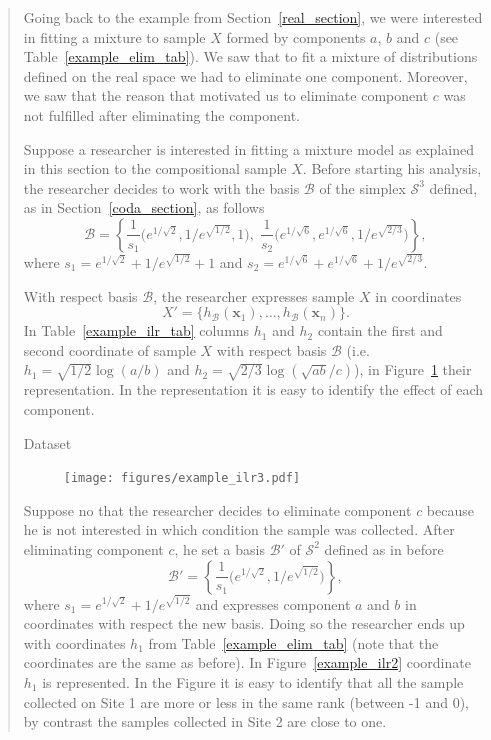 \documentclass[10pt, a4paper]{article}
\begin{document}
\begin{quote}

Going back to the example from Section~\ref{real_section}, we were interested in fitting a mixture to sample $X$ formed by components $a$, $b$ and $c$ (see Table~\ref{example_elim_tab}). We saw that to fit a mixture of distributions defined on the real space we had to eliminate one component. Moreover, we saw that the reason that motivated us to eliminate component $c$ was not fulfilled after eliminating the component.

Suppose a researcher is interested in fitting a mixture model  as explained in this section to the compositional sample $X$. Before starting his analysis, the researcher decides to work with the basis $\mathcal{B}$ of the simplex $\mathcal{S}^3$ defined, as in Section~\ref{coda_section}, as follows
\begin{equation}
\mathcal{B} = \left\{ \frac{1}{s_1}\Big( e^{1/\sqrt{2}}, 1/e^{\sqrt{1/2}}, 1 \Big), \; \frac{1}{s_2}\Big( e^{1/\sqrt{6}}, e^{1/\sqrt{6}}, 1/e^{\sqrt{2/3}} \Big) \right\},
\end{equation}
where $s_1 = e^{1/\sqrt{2}} + 1/e^{\sqrt{ 1/2}} + 1$ and $s_2= e^{1/\sqrt{6}} + e^{1/\sqrt{6}} + 1/e^{\sqrt{2/3}}$. 

With respect basis $\mathcal{B}$, the researcher expresses sample $X$ in coordinates 
\[X' = \{h_{\mathcal{B}}(\textbf{x}_1), \dots, h_{\mathcal{B}}(\textbf{x}_n)\}.\] In Table~\ref{example_ilr_tab} columns $h_1$ and $h_2$ contain the first and second coordinate of sample $X$ with respect basis $\mathcal{B}$ (i.e. $h_1 = \sqrt{1/2} \log(a/b)$ and $h_2 = \sqrt{2/3} \log(\sqrt{ab} / c)$), in Figure~\ref{example_ilr3} their representation. In the representation it is easy to identify the effect of each component.

\begin{table}
\centering
\scriptsize

\caption{Dataset}
\label{example_ilr_tab}
\end{table}

\begin{figure}[thbp]
\centering
\texttt{[image: figures/example\_ilr3.pdf]}
\caption{}\label{example_ilr3}
\end{figure}

Suppose no that the researcher decides to eliminate component $c$ because he is not interested in which condition the sample was collected. After eliminating component $c$, he set a basis $\mathcal{B}'$ of $\mathcal{S}^2$ defined as in before
\begin{equation}
\mathcal{B}' = \left\{ \frac{1}{s_1}\Big( e^{1/\sqrt{2}}, 1/e^{\sqrt{1/2}} \Big) \right\},
\end{equation}
where $s_1 = e^{1/\sqrt{2}} + 1/e^{\sqrt{ 1/2}}$ and expresses component $a$ and $b$ in coordinates with respect the new basis. Doing so the researcher ends up with coordinates $h_1$ from Table~\ref{example_elim_tab} (note that the coordinates are the same as before). In Figure~\ref{example_ilr2} coordinate $h_1$ is represented. In the Figure it is easy to identify that all the sample collected on Site 1 are more or less in the same rank (between -1 and 0), by contrast the samples collected in Site 2 are close to one.


\end{quote}
\end{document}
